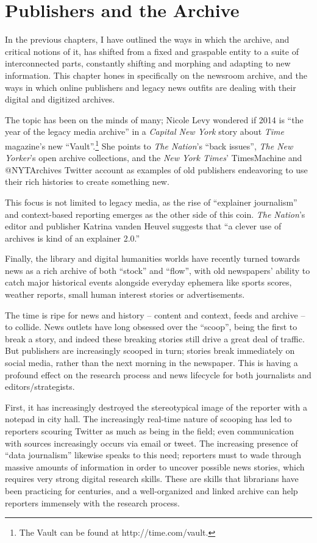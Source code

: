 \chapter{Publishers and the Archive}

In the previous chapters, I have outlined the ways in which the archive, and critical notions of it, has shifted from a fixed and graspable entity to a suite of interconnected parts, constantly shifting and morphing and adapting to new information. This chapter hones in specifically on the newsroom archive, and the ways in which online publishers and legacy news outfits are dealing with their digital and digitized archives.

The topic has been on the minds of many; Nicole Levy wondered if 2014 is ``the year of the legacy media archive'' in a \emph{Capital New York} story about \emph{Time} magazine's new ``Vault''.\footnote{The Vault can be found at http://time.com/vault.} She points to \emph{The Nation}'s ``back issues'', \emph{The New Yorker}'s open archive collections, and the \emph{New York Times}' TimesMachine and @NYTArchives Twitter account as examples of old publishers endeavoring to use their rich histories to create something new.\autocite{}

This focus is not limited to legacy media, as the rise of ``explainer journalism'' and context-based reporting emerges as the other side of this coin. \emph{The Nation}'s editor and publisher Katrina vanden Heuvel suggests that ``a clever use of archives is kind of an explainer 2.0.''\autocite{} %

Finally, the library and digital humanities worlds have recently turned towards news as a rich archive of both ``stock'' and ``flow'', with old newspapers' ability to catch major historical events alongside everyday ephemera like sports scores, weather reports, small human interest stories or advertisements.  %

The time is ripe for news and history -- content and context, feeds and archive -- to collide. News outlets have long obsessed over the ``scoop'', being the first to break a story, and indeed these breaking stories still drive a great deal of traffic. But publishers are increasingly scooped in turn; stories break immediately on social media, rather than the next morning in the newspaper. This is having a profound effect on the research process and news lifecycle for both journalists and editors/strategists.

First, it has increasingly destroyed the stereotypical image of the reporter with a notepad in city hall. The increasingly real-time nature of scooping has led to reporters scouring Twitter as much as being in the field; even communication with sources increasingly occurs via email or tweet. The increasing presence of ``data journalism'' likewise speaks to this need; reporters must to wade through massive amounts of information in order to uncover possible news stories, which requires very strong digital research skills. These are skills that librarians have been practicing for centuries, and a well-organized and linked archive can help reporters immensely with the research process.


